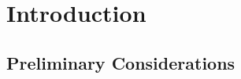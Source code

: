 
\chapter{Introduction} %

\label{Chapter1} %


\newcommand{\keyword}[1]{\textbf{#1}}
\newcommand{\tabhead}[1]{\textbf{#1}}
\newcommand{\code}[1]{\texttt{#1}}
\newcommand{\file}[1]{\texttt{\bfseries#1}}
\newcommand{\option}[1]{\texttt{\itshape#1}}


\section{Preliminary Considerations}

